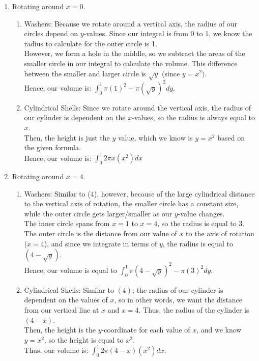 \documentclass{article}
\begin{document}
\begin{enumerate}
    \item Rotating around $x = 0$.
    \begin{enumerate}
        \item Washers: Because we rotate around a vertical axis, the radius of our circles depend on $y$-values. Since our integral is from 0 to 1, we know the radius to calculate for the outer circle is 1.\\
        However, we form a hole in the middle, so we subtract the areas of the smaller circle in our integral to calculate the volume. This difference between the smaller and larger circle is $\sqrt{y}$ (since $y = x^2)$.\\
        Hence, our volume is: $\int_0^1 \pi(1)^2 - \pi(\sqrt{y})^2 dy$. 
        \item Cylindrical Shells: Since we rotate around the vertical axis, the radius of our cylinder is dependent on the $x$-values, so the radius is always equal to $x$.\\
        Then, the height is just the $y$ value, which we know is $y= x^2$ based on the given formula.\\
        Hence, our volume is:
        $\int_0^1 2\pi x(x^2) dx$
    \end{enumerate}
    
    \item Rotating around $x = 4$.
    \begin{enumerate}
        \item Washers: Similar to (4), however, because of the large cylindrical distance to the vertical axis of rotation, the smaller circle has a constant size, while the outer circle gets larger/smaller as our $y$-value changes.\\
        The inner circle spans from $x = 1$ to $x=4$, so the radius is equal to 3.\\
        The outer circle is the distance from our value of $x$ to the axis of rotation ($x=4$), and since we integrate in terms of $y$, the radius is equal to $(4 - \sqrt{y})$.\\
        Hence, our volume is equal to $\int_0^1 \pi (4 - \sqrt{y})^2 - \pi(3)^2 dy$.
        \item Cylindrical Shells: Similar to $(4)$; the radius of our cylinder is dependent on the values of $x$, so in other words, we want the distance from our vertical line at $x$ and $x = 4$. Thus, the radius of the cylinder is $(4 - x)$.\\
        Then, the height is the $y$-coordinate for each value of $x$, and we know $y = x^2$, so the height is equal to $x^2$.\\
        Thus, our volume is: $\int_0^1 2\pi (4-x)(x^2) dx$.
    \end{enumerate}
    

\end{enumerate}
\end{document}

